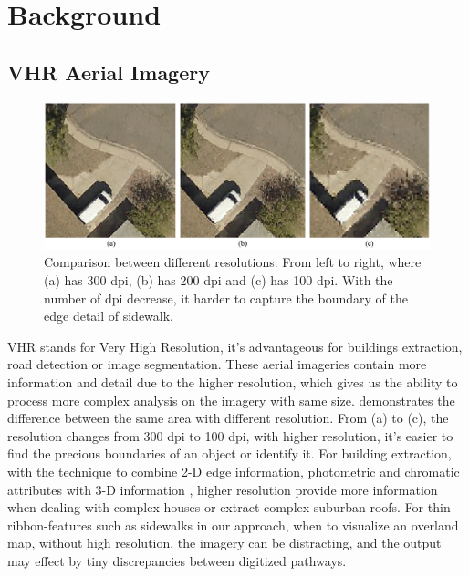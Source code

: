 \chapter{Background}


\section{\ac{VHR} Aerial Imagery}

\begin{figure}[H]
    \centering
    \includegraphics[width=\textwidth]{Figures/arz_7_resolution_compare.png}
    \caption[Resolution Comparison]{Comparison between different resolutions. From left to right, where (a) has 300 dpi, (b) has 200 dpi and (c) has 100 dpi. With the number of dpi decrease, it harder to capture the boundary of the edge detail of sidewalk.}
    \label{fig:vhr_compare}
\end{figure}

\ac{VHR} stands for Very High Resolution, it's advantageous for buildings extraction, road detection or image segmentation\cite{FREIRE20141, 10.1007/BFb0015525, 10.1007/978-3-642-15567-3_16}. These aerial imageries contain more information and detail due to the higher resolution, which gives us the ability to process more complex analysis on the imagery with same size.  demonstrates the difference between the same area with different resolution. From (a) to (c), the resolution changes from 300 \ac{dpi} to 100 \ac{dpi}, with higher resolution, it's easier to find the precious boundaries of an object or identify it. For building extraction, with the technique to combine 2-D edge information, photometric and chromatic attributes with 3-D information \cite{10.1007/BFb0015525}, higher resolution provide more information when dealing with complex houses or extract complex suburban roofs. For thin ribbon-features such as sidewalks in our approach, when to visualize an overland map, without high resolution, the imagery can be distracting, and the output may effect by tiny discrepancies between digitized  pathways\cite{10.1007/978-3-642-15567-3_16}. 


